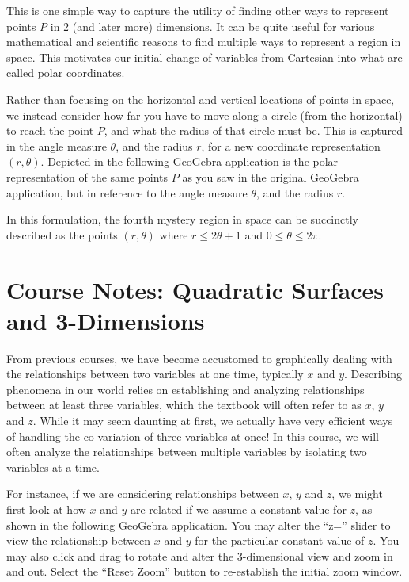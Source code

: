 \documentclass{ximera}
\begin{document}
\begin{center}
\end{center}

This is one simple way to capture the utility of finding other ways to represent points $P$ in 2 (and later more) dimensions. It can be quite useful for various mathematical and scientific reasons to find multiple ways to represent a region in space. This motivates our initial change of variables from Cartesian into what are called polar coordinates.

Rather than focusing on the horizontal and vertical locations of points in space, we instead consider how far you have to move along a circle (from the horizontal) to reach the point $P$, and what the radius of that circle must be. This is captured in the angle measure $\theta$, and the radius $r$, for a new coordinate representation $(r,\theta)$. Depicted in the following GeoGebra application is the polar representation of the same points $P$ as you saw in the original GeoGebra application, but in reference to the angle measure $\theta$, and the radius $r$.

\begin{center}
\end{center}

In this formulation, the fourth mystery region in space can be succinctly described as the points $(r,\theta)$ where $r \leq 2\theta + 1$ and $0 \leq \theta \leq 2\pi$.


\section{Course Notes: Quadratic Surfaces and 3-Dimensions}

From previous courses, we have become accustomed to graphically dealing with the relationships between two variables at one time, typically $x$ and $y$. Describing phenomena in our world relies on establishing and analyzing relationships between at least three variables, which the textbook will often refer to as $x$, $y$ and $z$. While it may seem daunting at first, we actually have very efficient ways of handling the co-variation of three variables at once! In this course, we will often analyze the relationships between multiple variables by isolating two variables at a time.

For instance, if we are considering relationships between $x$, $y$ and $z$, we might first look at how $x$ and $y$ are related if we assume a constant value for $z$, as shown in the following GeoGebra application. You may alter the ``z='' slider to view the relationship between $x$ and $y$ for the particular constant value of $z$. You may also click and drag to rotate and alter the 3-dimensional view and zoom in and out. Select the ``Reset Zoom'' button to re-establish the initial zoom window.
\end{document}
